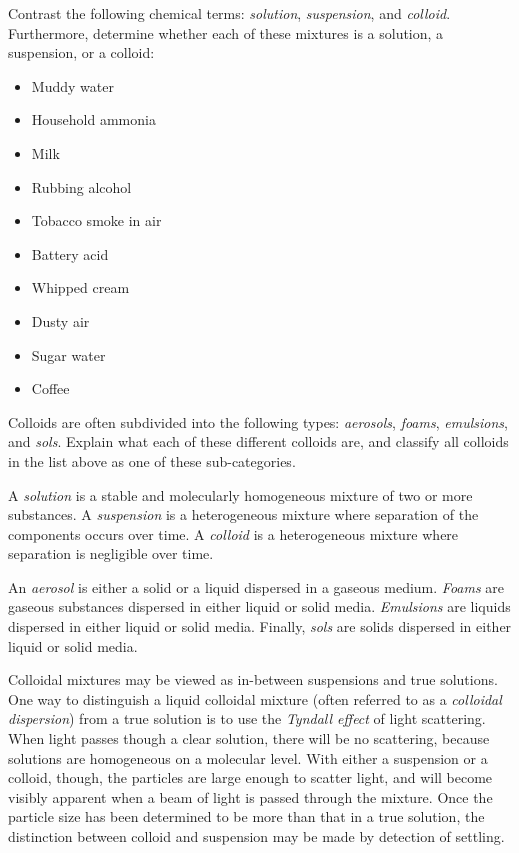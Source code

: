 

Contrast the following chemical terms: {\it solution}, {\it suspension}, and {\it colloid}.  Furthermore, determine whether each of these mixtures is a solution, a suspension, or a colloid:

\begin{itemize}
\item{} Muddy water
\item{} Household ammonia
\item{} Milk
\item{} Rubbing alcohol
\item{} Tobacco smoke in air
\item{} Battery acid
\item{} Whipped cream
\item{} Dusty air
\item{} Sugar water
\item{} Coffee
\end{itemize} 

Colloids are often subdivided into the following types: {\it aerosols}, {\it foams}, {\it emulsions}, and {\it sols}.  Explain what each of these different colloids are, and classify all colloids in the list above as one of these sub-categories.







A {\it solution} is a stable and molecularly homogeneous mixture of two or more substances.  A {\it suspension} is a heterogeneous mixture where separation of the components occurs over time.  A {\it colloid} is a heterogeneous mixture where separation is negligible over time.

\vskip 10pt

An {\it aerosol} is either a solid or a liquid dispersed in a gaseous medium.  {\it Foams} are gaseous substances dispersed in either liquid or solid media.  {\it Emulsions} are liquids dispersed in either liquid or solid media.  Finally, {\it sols} are solids dispersed in either liquid or solid media.

\vskip 10pt

Colloidal mixtures may be viewed as in-between suspensions and true solutions.  One way to distinguish a liquid colloidal mixture (often referred to as a {\it colloidal dispersion}) from a true solution is to use the {\it Tyndall effect} of light scattering.  When light passes though a clear solution, there will be no scattering, because solutions are homogeneous on a molecular level.  With either a suspension or a colloid, though, the particles are large enough to scatter light, and will become visibly apparent when a beam of light is passed through the mixture.  Once the particle size has been determined to be more than that in a true solution, the distinction between colloid and suspension may be made by detection of settling.

